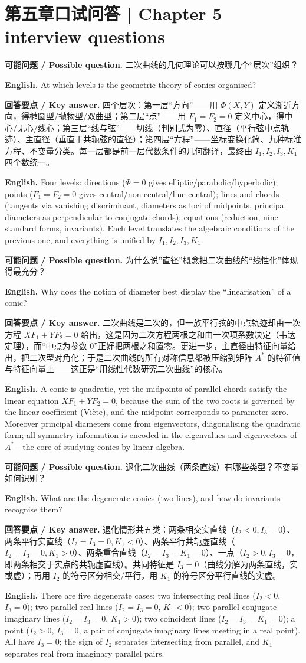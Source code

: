 \documentclass[UTF8,11pt,a4paper]{ctexart}
\newcommand{\EN}[1]{\par\noindent \textbf{English.} #1\par}
\newcommand{\ASK}[4]{\par\noindent \textbf{可能问题 / Possible question.} #1\par\EN{#2}\noindent \textbf{回答要点 / Key answer.} #3\par\EN{#4}\medskip}
\theoremstyle{definition}
\begin{document}
\section{\label{sec:16}第五章口试问答 | Chapter 5 interview questions}
\ASK{二次曲线的几何理论可以按哪几个``层次''组织？}{At which levels is the geometric theory of conics organised?}{四个层次：第一层``方向''——用 $\Phi(X,Y)$ 定义渐近方向，得椭圆型/抛物型/双曲型；第二层``点''——用 $F_1=F_2=0$ 定义中心，得中心/无心/线心；第三层``线与弦''——切线（判别式为零）、直径（平行弦中点轨迹）、主直径（垂直于共轭弦的直径）；第四层``方程''——坐标变换化简、九种标准方程、不变量分类。每一层都是前一层代数条件的几何翻译，最终由 $I_1,I_2,I_3,K_1$ 四个数统一。}{Four levels: directions ($\Phi=0$ gives elliptic/parabolic/hyperbolic); points ($F_1=F_2=0$ gives central/non-central/line-central); lines and chords (tangents via vanishing discriminant, diameters as loci of midpoints, principal diameters as perpendicular to conjugate chords); equations (reduction, nine standard forms, invariants). Each level translates the algebraic conditions of the previous one, and everything is unified by $I_1,I_2,I_3,K_1$.}

\ASK{为什么说''直径''概念把二次曲线的``线性化''体现得最充分？}{Why does the notion of diameter best display the ``linearisation'' of a conic?}{二次曲线是二次的，但一族平行弦的中点轨迹却由一次方程 $XF_1+YF_2=0$ 给出，这是因为二次方程两根之和由一次项系数决定（韦达定理），而``中点为参数 $0$''正好把两根之和置零。更进一步，主直径由特征向量给出，把二次型对角化；于是二次曲线的所有对称信息都被压缩到矩阵 $A^*$ 的特征值与特征向量上——这正是``用线性代数研究二次曲线''的核心。}{A conic is quadratic, yet the midpoints of parallel chords satisfy the linear equation $XF_1+YF_2=0$, because the sum of the two roots is governed by the linear coefficient (Viète), and the midpoint corresponds to parameter zero. Moreover principal diameters come from eigenvectors, diagonalising the quadratic form; all symmetry information is encoded in the eigenvalues and eigenvectors of $A^*$---the core of studying conics by linear algebra.}

\ASK{退化二次曲线（两条直线）有哪些类型？不变量如何识别？}{What are the degenerate conics (two lines), and how do invariants recognise them?}{退化情形共五类：两条相交实直线（$I_2<0,I_3=0$）、两条平行实直线（$I_2=I_3=0,K_1<0$）、两条平行共轭虚直线（$I_2=I_3=0,K_1>0$）、两条重合直线（$I_2=I_3=K_1=0$）、一点（$I_2>0,I_3=0$，即两条相交于实点的共轭虚直线）。共同特征是 $I_3=0$（曲线分解为两条直线，实或虚）；再用 $I_2$ 的符号区分相交/平行，用 $K_1$ 的符号区分平行直线的实虚。}{There are five degenerate cases: two intersecting real lines ($I_2<0$, $I_3=0$); two parallel real lines ($I_2=I_3=0$, $K_1<0$); two parallel conjugate imaginary lines ($I_2=I_3=0$, $K_1>0$); two coincident lines ($I_2=I_3=K_1=0$); a point ($I_2>0$, $I_3=0$, a pair of conjugate imaginary lines meeting in a real point). All have $I_3=0$; the sign of $I_2$ separates intersecting from parallel, and $K_1$ separates real from imaginary parallel pairs.}
\end{document}
